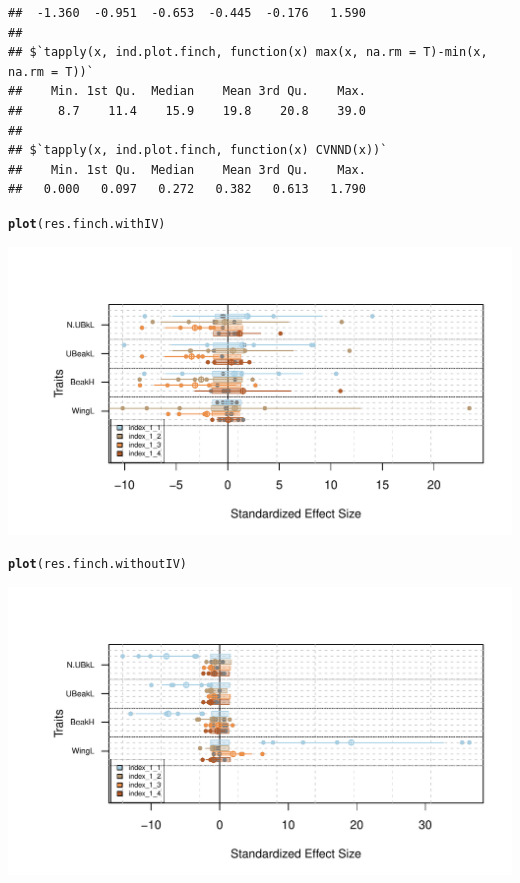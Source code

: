 \documentclass[12pt]{article}\usepackage[]{graphicx}\usepackage[]{color}
\makeatletter
\def\maxwidth{ %
  \ifdim\Gin@nat@width>\linewidth
    \linewidth
  \else
    \Gin@nat@width
  \fi
}
\newcommand{\hlstd}[1]{\textcolor[rgb]{0.345,0.345,0.345}{#1}}%
\newcommand{\hlkwd}[1]{\textcolor[rgb]{0.737,0.353,0.396}{\textbf{#1}}}%
\newenvironment{kframe}{%
 \def\at@end@of@kframe{}%
 \ifinner\ifhmode%
  \def\at@end@of@kframe{\end{minipage}}%
  \begin{minipage}{\columnwidth}%
 \fi\fi%
 \def\FrameCommand##1{\hskip\@totalleftmargin \hskip-\fboxsep
 \colorbox{shadecolor}{##1}\hskip-\fboxsep
     \hskip-\linewidth \hskip-\@totalleftmargin \hskip\columnwidth}%
 \MakeFramed {\advance\hsize-\width
   \@totalleftmargin\z@ \linewidth\hsize
   \@setminipage}}%
 {\par\unskip\endMakeFramed%
 \at@end@of@kframe}
\newenvironment{knitrout}{}{} %
\makeatother
\begin{document}
\begin{knitrout}
\begin{kframe}
\begin{verbatim}
##  -1.360  -0.951  -0.653  -0.445  -0.176   1.590 
## 
## $`tapply(x, ind.plot.finch, function(x) max(x, na.rm = T)-min(x, na.rm = T))`
##    Min. 1st Qu.  Median    Mean 3rd Qu.    Max. 
##     8.7    11.4    15.9    19.8    20.8    39.0 
## 
## $`tapply(x, ind.plot.finch, function(x) CVNND(x))`
##    Min. 1st Qu.  Median    Mean 3rd Qu.    Max. 
##   0.000   0.097   0.272   0.382   0.613   1.790
\end{verbatim}
\begin{alltt}
\hlkwd{plot}\hlstd{(res.finch.withIV)}
\end{alltt}
\end{kframe}
\includegraphics[width=\maxwidth]{figure/unnamed-chunk-461} 
\begin{kframe}\begin{alltt}
\hlkwd{plot}\hlstd{(res.finch.withoutIV)}
\end{alltt}
\end{kframe}
\includegraphics[width=\maxwidth]{figure/unnamed-chunk-462} 

\end{knitrout}
\end{document}
